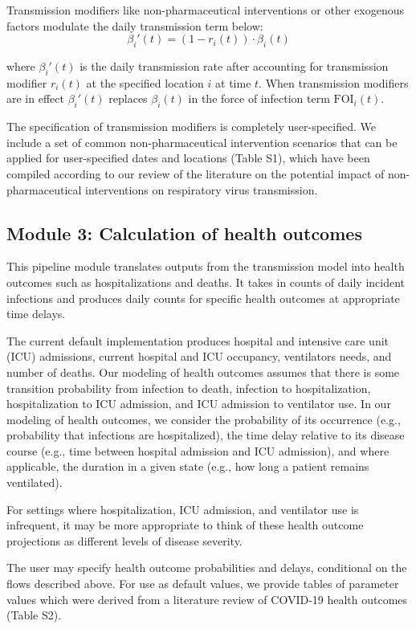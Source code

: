Transmission modifiers like non-pharmaceutical interventions or other exogenous factors modulate the daily transmission term below:
\begin{equation}
\beta _i'(t)=\left(1-r_i(t)\right)\cdot \beta_i (t)
\end{equation}

where $\beta_i'(t)$ is the daily transmission rate after accounting for transmission modifier $r_i(t)$ at the specified location $i$ at time $t$. When transmission modifiers are in effect $\beta_i'(t)$ replaces $\beta_i(t)$ in the force of infection term $\text{FOI}_i(t)$.


The specification of transmission modifiers is completely user-specified. We include a set of common non-pharmaceutical intervention scenarios that can be applied for user-specified dates and locations (Table S1), which have been compiled according to our review of the literature on the potential impact of non-pharmaceutical interventions on respiratory virus transmission.

\subsection{Module 3: Calculation of health outcomes}
This pipeline module translates outputs from the transmission model into health outcomes such as hospitalizations and deaths. It takes in counts of daily incident infections and produces daily counts for specific health outcomes at appropriate time delays.

The current default implementation produces hospital and intensive care unit (ICU) admissions, current hospital and ICU occupancy, ventilators needs, and number of deaths. Our modeling of health outcomes assumes that there is some transition probability from infection to death, infection to hospitalization, hospitalization to ICU admission, and ICU admission to ventilator use. In our modeling of health outcomes, we consider the probability of its occurrence (e.g., probability that infections are hospitalized), the time delay relative to its disease course (e.g., time between hospital admission and ICU admission), and where applicable, the duration in a given state (e.g., how long a patient remains ventilated).

For settings where hospitalization, ICU admission, and ventilator use is infrequent, it may be more appropriate to think of these health outcome projections as different levels of disease severity.

The user may specify health outcome probabilities and delays, conditional on the flows described above. For use as default values, we provide tables of parameter values which were derived from a literature review of COVID-19 health outcomes (Table S2).

